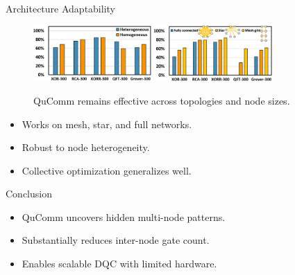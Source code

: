 \documentclass{beamer}
\begin{document}
	\begin{frame}{Architecture Adaptability}
		\begin{figure}
			\includegraphics[width=0.4\textwidth]{figure/ad-1.png}
			\hspace*{4pt}
			\includegraphics[width=0.4\textwidth]{figure/ad-2.png}
			\caption[]{QuComm remains effective across topologies and node sizes.}
		\end{figure}
		\begin{itemize}
			\item Works on mesh, star, and full networks.
			\item Robust to node heterogeneity.
			\item Collective optimization generalizes well.
		\end{itemize}
	\end{frame}
	
	\begin{frame}{Conclusion}
		\begin{itemize}
			\item QuComm uncovers hidden multi-node patterns.
			\item Substantially reduces inter-node gate count.
			\item Enables scalable DQC with limited hardware.
		\end{itemize}
	\end{frame}
	
\end{document}
